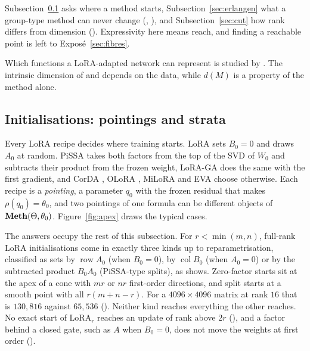 Subsection~\ref{sec:strata} asks where a method starts, Subsection~\ref{sec:erlangen} what a group-type method can never
change (, ), and Subsection~\ref{sec:cut} how rank differs from dimension
(). Expressivity here means reach, and finding a reachable point is left to
Exposé~\ref{sec:fibres}.

Which functions a LoRA-adapted network can represent is studied by \citet{zeng2023expressive}. The intrinsic dimension
of \citet{li2018measuring} and \citet{aghajanyan2020intrinsic} depends on the data, while $d(M)$ is a property of the
method alone.

\subsection{Initialisations: pointings and strata}\label{sec:strata}

Every LoRA recipe decides where training starts. LoRA \citep{hu2021lora} sets $B_0=0$ and draws $A_0$ at random. PiSSA
\citep{meng2024pissa} takes both factors from the top of the SVD of $W_0$ and subtracts their product from the frozen
weight, LoRA-GA \citep{wang2024lorab} does the same with the first gradient, and CorDA \citep{yang2024corda}, OLoRA
\citep{buyukakyuz2024olora}, MiLoRA \citep{wang2024milora} and EVA \citep{paischer2024parameter} choose otherwise. Each
recipe is a \emph{pointing}, a parameter $q_0$ with the frozen residual that makes $\rho(q_0)=\theta_0$, and two
pointings of one formula can be different objects of $\mathbf{Meth}(\Theta,\theta_0)$. Figure~\ref{fig:apex} draws the typical
cases.

The answers occupy the rest of this subsection. For $r<\min(m,n)$, full-rank LoRA initialisations come in exactly three
kinds up to reparametrisation, classified as sets by $\operatorname{row}A_0$ (when $B_0=0$), by $\operatorname{col}B_0$
(when $A_0=0$) or by the subtracted product $B_0A_0$ (PiSSA-type splits), as  shows. Zero-factor
starts sit at the apex of a cone with $mr$ or $nr$ first-order directions, and split starts at a smooth point with all
$r(m+n-r)$. For a $4096\times4096$ matrix at rank $16$ that is $130{,}816$ against $65{,}536$
(). Neither kind reaches everything the other reaches. No exact start of LoRA$_r$ reaches an
update of rank above $2r$ (), and a factor behind a closed gate, such as $A$ when $B_0=0$, does
not move the weights at first order ().

